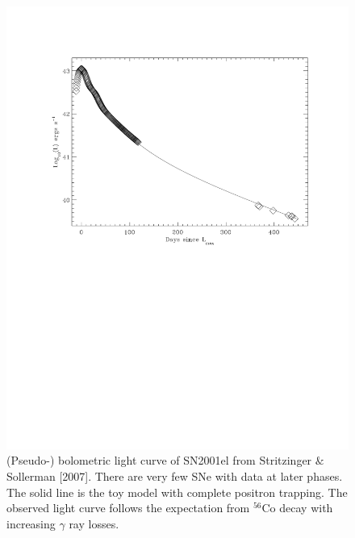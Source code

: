\documentclass[11pt]{article}
\begin{document}
\begin{figure}
\includegraphics[width=.8\textwidth, trim=0 300 60 0]{sn01el_bol.pdf}
\caption{(Pseudo-) bolometric light curve of SN2001el from Stritzinger $\&$ Sollerman [2007]. There are very few SNe with data at later phases. The solid line is the toy model with complete positron trapping. The observed light curve follows the expectation from $^{56}$Co decay with increasing $\gamma$ ray losses. }
\label{fig:bol}
\end{figure}
\end{document}
